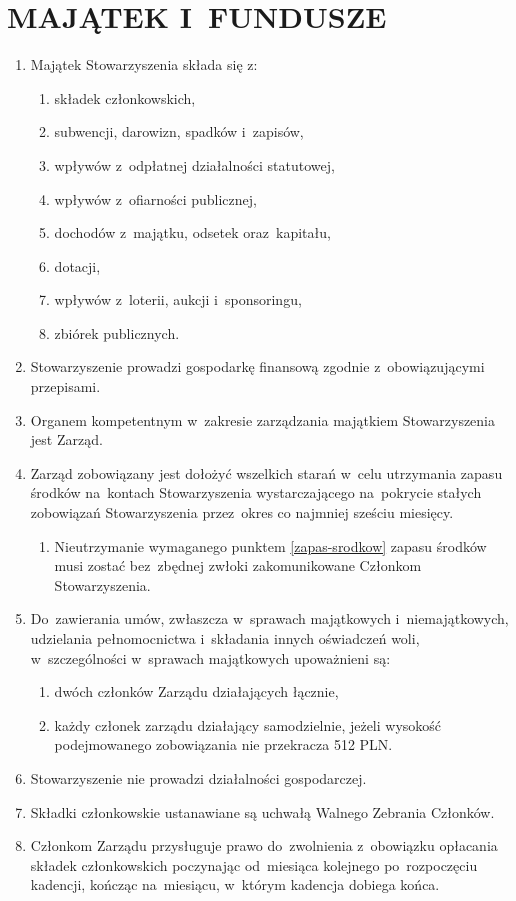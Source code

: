 \documentclass{article}
\begin{document}
\section{MAJĄTEK I~FUNDUSZE}
  \begin{enumerate}
    \item Majątek Stowarzyszenia składa się z:
      \begin{enumerate}
        \item składek członkowskich,
        \item subwencji, darowizn, spadków i~zapisów,
        \item wpływów z~odpłatnej działalności statutowej,
        \item wpływów z~ofiarności publicznej,
        \item dochodów z~majątku, odsetek oraz~kapitału,
        \item dotacji,
        \item wpływów z~loterii, aukcji i~sponsoringu,
        \item zbiórek publicznych.
      \end{enumerate}
    \item Stowarzyszenie prowadzi gospodarkę finansową zgodnie z~obowiązującymi przepisami.
    \item Organem kompetentnym w~zakresie zarządzania majątkiem Stowarzyszenia jest Zarząd.
    \item Zarząd zobowiązany jest dołożyć wszelkich starań w~celu utrzymania zapasu środków na~kontach Stowarzyszenia wystarczającego na~pokrycie stałych zobowiązań Stowarzyszenia przez~okres co najmniej sześciu miesięcy. \label{zapas-srodkow}
      \begin{enumerate}
        \item Nieutrzymanie wymaganego punktem \ref{zapas-srodkow} zapasu środków musi zostać bez~zbędnej zwłoki zakomunikowane Członkom Stowarzyszenia.
      \end{enumerate}
    \item Do~zawierania umów, zwłaszcza w~sprawach majątkowych i~niemajątkowych, udzielania pełnomocnictwa i~składania innych oświadczeń woli, w~szczególności w~sprawach majątkowych upoważnieni są:
      \begin{enumerate}
        \item dwóch członków Zarządu działających łącznie,
        \item każdy członek zarządu działający samodzielnie, jeżeli wysokość podejmowanego zobowiązania nie przekracza 512 PLN.
      \end{enumerate}
    \item Stowarzyszenie nie prowadzi działalności gospodarczej.
    \item Składki członkowskie ustanawiane są uchwałą Walnego Zebrania Członków.
    \item Członkom Zarządu przysługuje prawo do~zwolnienia z~obowiązku opłacania składek członkowskich poczynając od~miesiąca kolejnego po~rozpoczęciu kadencji, kończąc na~miesiącu, w~którym kadencja dobiega końca.
  \end{enumerate}
\end{document}
